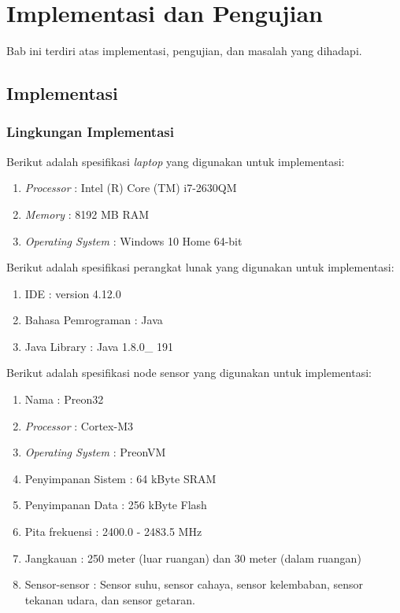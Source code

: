 \chapter{Implementasi dan Pengujian}
\label{chap:implementasiPengujian}

Bab ini terdiri atas implementasi, pengujian, dan masalah yang dihadapi.

\section{Implementasi}
\subsection{Lingkungan Implementasi}
Berikut adalah spesifikasi  {\it laptop} yang digunakan untuk implementasi:
\begin{enumerate}
	\item {\it Processor} : Intel (R) Core (TM) i7-2630QM
	\item {\it Memory} : 8192 MB RAM
	\item {\it Operating System} : Windows 10 Home 64-bit
\end{enumerate}

Berikut adalah spesifikasi perangkat lunak yang digunakan untuk implementasi:
\begin{enumerate}
	\item IDE : version 4.12.0
	\item Bahasa Pemrograman : Java
	\item Java Library : Java 1.8.0\_ 191
\end{enumerate}

Berikut adalah spesifikasi node sensor yang digunakan untuk implementasi:
\begin{enumerate}
    \item Nama : Preon32
    \item \textit{Processor} : Cortex-M3
    \item \textit{Operating System} : PreonVM
    \item Penyimpanan Sistem : 64 kByte SRAM
    \item Penyimpanan Data : 256 kByte Flash
    \item Pita frekuensi : 2400.0 - 2483.5 MHz
    \item Jangkauan : 250 meter (luar ruangan) dan 30 meter (dalam ruangan)
    \item Sensor-sensor : Sensor suhu, sensor cahaya, sensor kelembaban, sensor tekanan udara, dan sensor getaran.
\end{enumerate}

